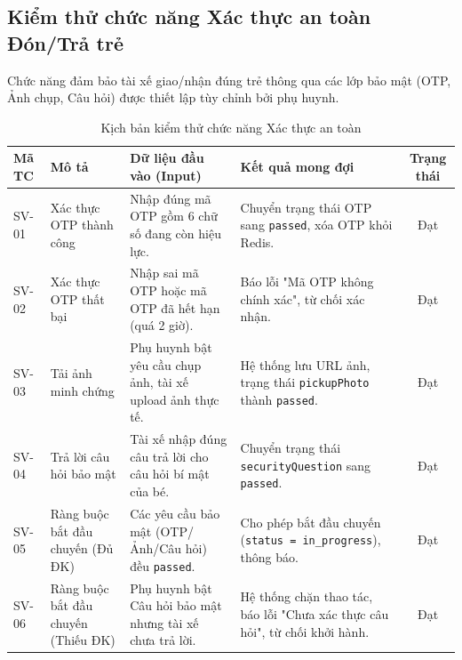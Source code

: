 \documentclass[../DoAn.tex]{subfiles}
\begin{document}
\newpage
\subsection{Kiểm thử chức năng Xác thực an toàn Đón/Trả trẻ}
Chức năng đảm bảo tài xế giao/nhận đúng trẻ thông qua các lớp bảo mật (OTP, Ảnh chụp, Câu hỏi) được thiết lập tùy chỉnh bởi phụ huynh.

\begin{table}[H]
    \centering
    \caption{Kịch bản kiểm thử chức năng Xác thực an toàn}
    \begin{tabular}{|l|p{3.5cm}|p{4.5cm}|p{4.5cm}|c|}
        \hline
        \textbf{Mã TC} & \textbf{Mô tả}                      & \textbf{Dữ liệu đầu vào (Input)}                           & \textbf{Kết quả mong đợi}                                                    & \textbf{Trạng thái} \\ \hline
        SV-01          & Xác thực OTP thành công             & Nhập đúng mã OTP gồm 6 chữ số đang còn hiệu lực.           & Chuyển trạng thái OTP sang \texttt{passed}, xóa OTP khỏi Redis.              & Đạt                 \\ \hline
        SV-02          & Xác thực OTP thất bại               & Nhập sai mã OTP hoặc mã OTP đã hết hạn (quá 2 giờ).        & Báo lỗi "Mã OTP không chính xác", từ chối xác nhận.                          & Đạt                 \\ \hline
        SV-03          & Tải ảnh minh chứng                  & Phụ huynh bật yêu cầu chụp ảnh, tài xế upload ảnh thực tế. & Hệ thống lưu URL ảnh, trạng thái \texttt{pickupPhoto} thành \texttt{passed}. & Đạt                 \\ \hline
        SV-04          & Trả lời câu hỏi bảo mật             & Tài xế nhập đúng câu trả lời cho câu hỏi bí mật của bé.    & Chuyển trạng thái \texttt{securityQuestion} sang \texttt{passed}.            & Đạt                 \\ \hline
        SV-05          & Ràng buộc bắt đầu chuyến (Đủ ĐK)    & Các yêu cầu bảo mật (OTP/Ảnh/Câu hỏi) đều \texttt{passed}. & Cho phép bắt đầu chuyến (\texttt{status = in\_progress}), thông báo.         & Đạt                 \\ \hline
        SV-06          & Ràng buộc bắt đầu chuyến (Thiếu ĐK) & Phụ huynh bật Câu hỏi bảo mật nhưng tài xế chưa trả lời.   & Hệ thống chặn thao tác, báo lỗi "Chưa xác thực câu hỏi", từ chối khởi hành.  & Đạt                 \\ \hline
    \end{tabular}
\end{table}
\end{document}
